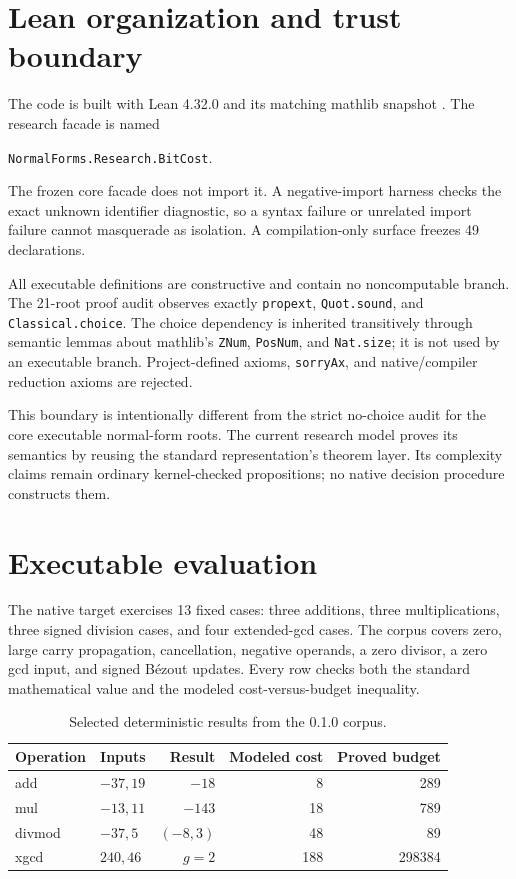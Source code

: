 \documentclass[11pt]{article}
\newcommand{\code}[1]{\texttt{#1}}
\begin{document}
\section{Lean organization and trust boundary}

The code is built with Lean 4.32.0 and its matching mathlib snapshot
\citep{deMouraUllrich2021Lean4,lean4320source,mathlib4320source}.  The
research facade is named
\begin{center}
\code{NormalForms.Research.BitCost}.
\end{center}
The frozen core facade does not import it.  A negative-import harness checks
the exact unknown identifier diagnostic, so a syntax failure or unrelated
import failure cannot masquerade as isolation.  A compilation-only surface
freezes 49 declarations.

All executable definitions are constructive and contain no noncomputable
branch.  The 21-root proof audit observes exactly
\code{propext}, \code{Quot.sound}, and \code{Classical.choice}.  The choice
dependency is inherited transitively through semantic lemmas about mathlib's
\code{ZNum}, \code{PosNum}, and \code{Nat.size}; it is not used by an
executable branch.  Project-defined axioms, \code{sorryAx}, and
native/compiler reduction axioms are rejected.

This boundary is intentionally different from the strict no-choice audit for
the core executable normal-form roots.  The current research model proves its
semantics by reusing the standard representation's theorem layer.  Its
complexity claims remain ordinary kernel-checked propositions; no native
decision procedure constructs them.

\section{Executable evaluation}

The native target exercises 13 fixed cases: three additions, three
multiplications, three signed division cases, and four extended-gcd cases.
The corpus covers zero, large carry propagation, cancellation, negative
operands, a zero divisor, a zero gcd input, and signed B\'ezout updates.  Every
row checks both the standard mathematical value and the modeled
cost-versus-budget inequality.

\begin{table}[ht]
\centering
\caption{Selected deterministic results from the 0.1.0 corpus.}
\begin{tabular}{@{}llrrr@{}}
\toprule
Operation & Inputs & Result & Modeled cost & Proved budget \\
\midrule
add    & $-37,19$  & $-18$     & 8   & 289 \\
mul    & $-13,11$  & $-143$    & 18  & 789 \\
divmod & $-37,5$   & $(-8,3)$  & 48  & 89 \\
xgcd   & $240,46$  & $g=2$     & 188 & 298384 \\
\bottomrule
\end{tabular}
\end{table}
\end{document}
